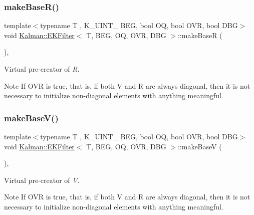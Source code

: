 \subsubsection{\texorpdfstring{make\+Base\+R()}{makeBaseR()}}
{\footnotesize\ttfamily template$<$typename T , K\+\_\+\+U\+I\+N\+T\+\_ B\+EG, bool OQ, bool O\+VR, bool D\+BG$>$ \\
void \mbox{\hyperlink{classKalman_1_1EKFilter}{Kalman\+::\+E\+K\+Filter}}$<$ T, B\+EG, OQ, O\+VR, D\+BG $>$\+::make\+BaseR (\begin{DoxyParamCaption}{ }\end{DoxyParamCaption})\hspace{0.3cm}{\ttfamily [protected]}, {\ttfamily [virtual]}}



Virtual pre-\/creator of {\itshape R}. 

\begin{DoxyNote}{Note}
If {\ttfamily O\+VR} is {\ttfamily true}, that is, if {\ttfamily both} V and R are always diagonal, then it is not necessary to initialize non-\/diagonal elements with anything meaningful. 
\end{DoxyNote}
\mbox{\label{classKalman_1_1EKFilter_a72e6e032ae5db155eb7d1ba1401db9be}} 
\subsubsection{\texorpdfstring{make\+Base\+V()}{makeBaseV()}}
{\footnotesize\ttfamily template$<$typename T , K\+\_\+\+U\+I\+N\+T\+\_ B\+EG, bool OQ, bool O\+VR, bool D\+BG$>$ \\
void \mbox{\hyperlink{classKalman_1_1EKFilter}{Kalman\+::\+E\+K\+Filter}}$<$ T, B\+EG, OQ, O\+VR, D\+BG $>$\+::make\+BaseV (\begin{DoxyParamCaption}{ }\end{DoxyParamCaption})\hspace{0.3cm}{\ttfamily [protected]}, {\ttfamily [virtual]}}



Virtual pre-\/creator of {\itshape V}. 

\begin{DoxyNote}{Note}
If {\ttfamily O\+VR} is {\ttfamily true}, that is, if {\ttfamily both} V and R are always diagonal, then it is not necessary to initialize non-\/diagonal elements with anything meaningful. 
\end{DoxyNote}
\mbox{\label{classKalman_1_1EKFilter_a89337cacd8115338ffd34637f0ecbd92}} 
